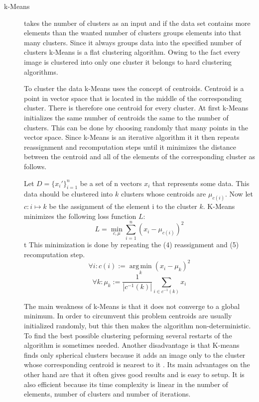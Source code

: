 \documentclass[journal]{vgtc}       %
\begin{document}
\begin{description}
\item [k-Means] takes the number of clusters as an input and if the data set contains more elements than the wanted number of clusters groups elements into that many clusters. Since it always groups data into the specified number of clusters k-Means is a flat clustering algorithm. Owing to the fact every image is clustered into only one cluster it belongs to hard clustering algorithms. 

To cluster the data k-Means uses the concept of centroids. Centroid is a point in vector space that is located in the middle of the corresponding cluster. There is therefore one centroid for every cluster. 
At first k-Means initializes the same number of centroids the same to the number of clusters. This can be done by choosing randomly that many points in the vector space. Since k-Means is an iterative algorithm it  it then repeats reassignment and recomputation steps until it minimizes the distance between the centroid and all of the elements of the corresponding cluster as follows. 

Let $D = \{x_i'\}_{i=1}^n$ be a set of n vectors $x_i$ that represents some data. This data should be clustered into $k$ clusters whose centroids are  $\mu_{c(i)}$. Now let $c: i \mapsto k$ be the assignment of the element i to the cluster $k$. 
K-Means minimizes the following loss function $L$:
\begin{equation}
L = \min_{c, \mu} \sum_{i=1}^{n}(x_i - \mu_{c(i)})^2
\end{equation} t
This minimization is done by repeating the (4) reassignment and (5) recomputation step.
\begin{equation}
\forall i: c(i) := \operatorname*{arg\,min}_k (x_i - \mu_k)^2
\end{equation}
\begin{equation}
\forall k: \mu_k := \frac{1}{|c^{-1}(k)|} \sum_{i \in c^{-1}(k)} x_i
\end{equation}


The main weakness of k-Means is that it does not converge to a global minimum. In order to circumvent this problem centroids are usually initialized randomly, but this then makes the algorithm non-deterministic. To find the best possible clustering peforming several restarts of the algorithm is sometimes needed.  Another disadvantage is that K-means finds only spherical clusters because it adds an image only to the cluster whose corresponding  centroid is nearest to it \cite{jain2010data}. Its main advantages on the other hand are that it often gives good results and is easy to setup. It is also efficient because its time complexity is linear in the number of elements, number of clusters and number of iterations. 


\end{description}
\end{document}
